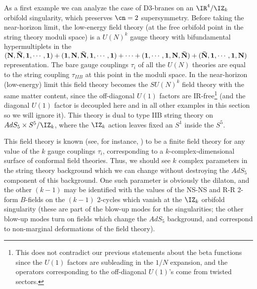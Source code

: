 As a first example we can analyze the case \cite{Kachru:1998ys} of
D3-branes on an $\IR^4/\IZ_k$ orbifold singularity, which preserves
$\cn=2$ supersymmetry. Before taking the near-horizon limit, the
low-energy field theory (at the free orbifold point in the string
theory moduli space) is a $U(N)^k$ gauge theory with bifundamental
hypermultiplets in the $\bf{(N,{\bar N},1,\cdots,1)+(1,N,{\bar
N},1,\cdots,1)+\cdots+ (1,\cdots,1,N,{\bar N})+({\bar
N},1,\cdots,1,N)}$ representation. The bare gauge couplings $\tau_i$
of all the $U(N)$ theories are equal to the string coupling
$\tau_{IIB}$ at this point in the moduli space. In the near-horizon
(low-energy) limit this field theory becomes the $SU(N)^k$ field
theory with the same matter content, since the off-diagonal $U(1)$
factors are IR-free\footnote{This does not contradict our previous
statements about the beta functions since the $U(1)$ factors are
subleading in the $1/N$ expansion, and the operators corresponding
to the off-diagonal $U(1)$'s come from twisted sectors.} 
(and the diagonal $U(1)$ factor is
decoupled here and in all other examples in this section so we will
ignore it).  This theory is dual to type IIB string theory on
$AdS_5\times S^5/\IZ_k$, where the $\IZ_k$ action leaves fixed an
$S^1$ inside the $S^5$.

This field theory is known (see, for instance, \cite{Witten:1997so})
to be a finite field theory for any value of the $k$ gauge couplings
$\tau_i$, corresponding to a $k$-complex-dimensional surface of
conformal field theories. Thus, we should see $k$ complex parameters
in the string theory background which we can change without destroying
the $AdS_5$ component of this background. One such parameter is
obviously the dilaton, and the other $(k-1)$ may be identified
\cite{Kachru:1998ys} with the values of the NS-NS and R-R 2-form
$B$-fields on the $(k-1)$ 2-cycles which vanish at the $\IZ_k$
orbifold singularity (these are part of the blow-up modes for the
singularities; the other blow-up modes turn on fields which change the
$AdS_5$ background, and correspond to non-marginal deformations of the
field theory).

